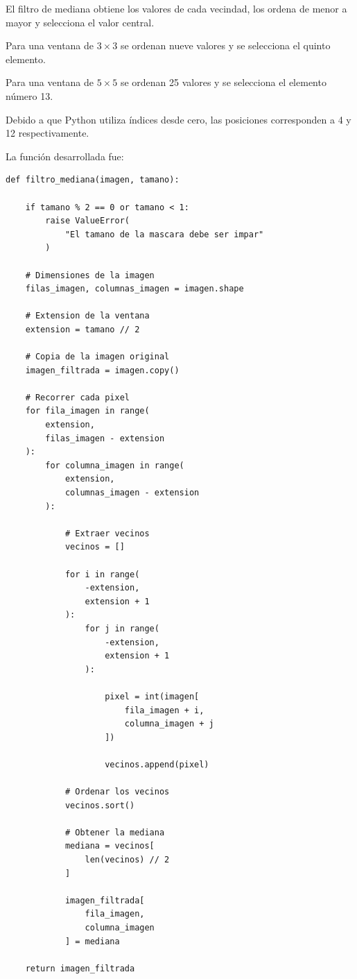 \documentclass[11pt,letterpaper]{article}
\begin{document}
El filtro de mediana obtiene los valores
de cada vecindad, los ordena de menor
a mayor y selecciona el valor central.

Para una ventana de $3\times3$ se
ordenan nueve valores y se selecciona
el quinto elemento.

Para una ventana de $5\times5$ se
ordenan 25 valores y se selecciona
el elemento número 13.

Debido a que Python utiliza índices
desde cero, las posiciones corresponden
a 4 y 12 respectivamente.

La función desarrollada fue:

\begin{lstlisting}
def filtro_mediana(imagen, tamano):

    if tamano % 2 == 0 or tamano < 1:
        raise ValueError(
            "El tamano de la mascara debe ser impar"
        )

    # Dimensiones de la imagen
    filas_imagen, columnas_imagen = imagen.shape

    # Extension de la ventana
    extension = tamano // 2

    # Copia de la imagen original
    imagen_filtrada = imagen.copy()

    # Recorrer cada pixel
    for fila_imagen in range(
        extension,
        filas_imagen - extension
    ):
        for columna_imagen in range(
            extension,
            columnas_imagen - extension
        ):

            # Extraer vecinos
            vecinos = []

            for i in range(
                -extension,
                extension + 1
            ):
                for j in range(
                    -extension,
                    extension + 1
                ):

                    pixel = int(imagen[
                        fila_imagen + i,
                        columna_imagen + j
                    ])

                    vecinos.append(pixel)

            # Ordenar los vecinos
            vecinos.sort()

            # Obtener la mediana
            mediana = vecinos[
                len(vecinos) // 2
            ]

            imagen_filtrada[
                fila_imagen,
                columna_imagen
            ] = mediana

    return imagen_filtrada
\end{lstlisting}
\end{document}
